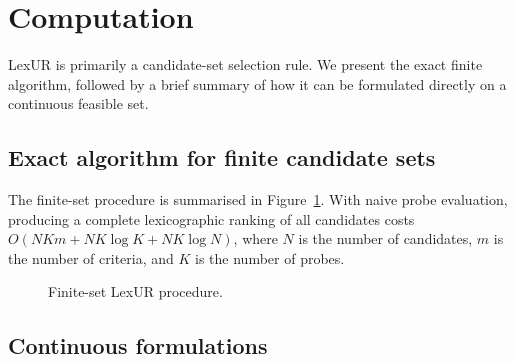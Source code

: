 \section{Computation}
\label{sec:direct}

LexUR is primarily a candidate-set selection rule. We present the exact finite algorithm, followed by a brief summary of how it can be formulated directly on a continuous feasible set.

\subsection{Exact algorithm for finite candidate sets}

The finite-set procedure is summarised in Figure~\ref{alg:finite}. With naive probe evaluation, producing a complete lexicographic ranking of all candidates costs $O(NKm + NK\log K + NK\log N)$, where $N$ is the number of candidates, $m$ is the number of criteria, and $K$ is the number of probes.

\begin{figure}[h]
\centering
{}
\caption{Finite-set LexUR procedure.}
\label{alg:finite}
\end{figure}

\subsection{Continuous formulations}

